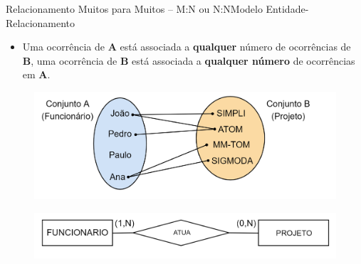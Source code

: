 \documentclass[t]{beamer}
\begin{document}
\begin{ftst}{Relacionamento Muitos para Muitos – M:N ou N:N}{Modelo Entidade-Relacionamento}
\begin{itemize}
    \item Uma ocorrência de \textbf{A} está associada a \textbf{qualquer} número de ocorrências de \textbf{B}, uma ocorrência de \textbf{B} está associada a \textbf{qualquer número} de ocorrências em \textbf{A}.
\end{itemize}
\begin{figure}
    \centering
    \includegraphics[scale=0.15]{Figuras/01_19.png}
\end{figure}
\begin{figure}
    \centering
    \includegraphics[scale=0.2]{Figuras/01_18.png}
\end{figure}
\end{ftst}

\end{document}
